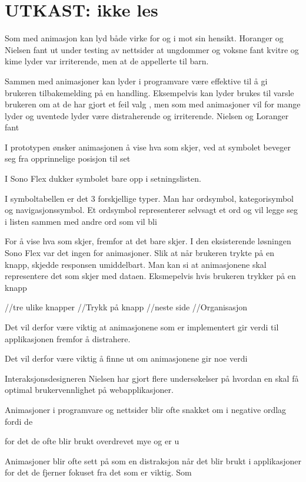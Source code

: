 
\section{UTKAST: ikke les}


Som med animasjon kan lyd både virke for og i mot sin hensikt. Horanger og Nielsen fant ut under testing av nettsider at ungdommer og voksne fant kvitre og kime lyder var irriterende, men at de appellerte til barn. 

Sammen med animasjoner kan lyder i programvare være effektive til å gi brukeren tilbakemelding på en handling. Eksempelvis kan lyder brukes til varsle brukeren om at de har gjort et feil valg \cite{}, men som med animasjoner vil for mange lyder og uventede lyder være distraherende og irriterende. Nielsen og Loranger fant 




I prototypen ønsker animasjonen å vise hva som skjer,  ved at symbolet beveger seg fra opprinnelige posisjon til set

I Sono Flex dukker symbolet bare opp i setningslisten.

I symboltabellen er det 3 forskjellige typer. Man har 
ordsymbol, kategorisymbol og navigasjonssymbol. Et ordsymbol representerer selvsagt et ord og vil legge seg i listen sammen med andre ord som vil bli 

For å vise hva som skjer, fremfor at det bare skjer. I den eksisterende løsningen Sono Flex var det ingen for animasjoner. Slik at når brukeren trykte på en knapp, skjedde responsen umiddelbart. Man kan si at animasjonene skal representere det som skjer med dataen. Eksmepelvis hvis brukeren trykker på en knapp 


//tre ulike knapper
    //Trykk på knapp
    //neste side
    //Organisasjon



Det vil derfor være viktig at animasjonene som er implementert gir verdi til applikasjonen fremfor å distrahere.

Det vil derfor være viktig å finne ut om animasjonene gir noe verdi 

Interaksjonsdesigneren Nielsen har gjort flere undersøkelser på hvordan en skal få optimal brukervennlighet på webapplikasjoner. 

Animasjoner i programvare og nettsider blir ofte snakket om i negative ordlag fordi de

for det de ofte blir brukt overdrevet mye og er u

Animasjoner blir ofte sett på som en distraksjon når det blir brukt i applikasjoner for det de fjerner fokuset fra det som er viktig. Som 


